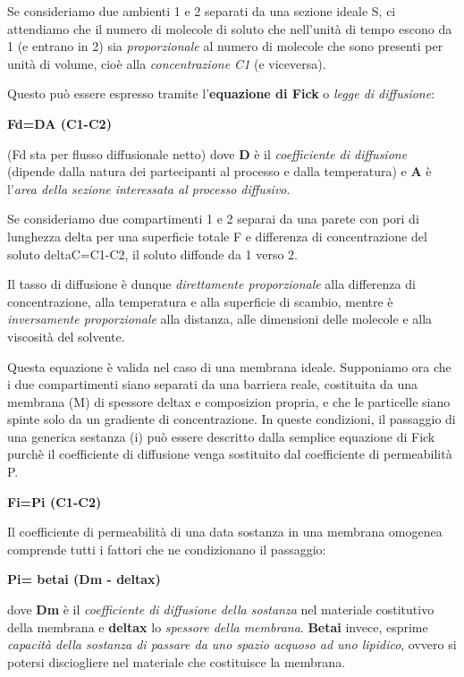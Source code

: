 \documentclass[]{article}
\begin{document}
Se consideriamo due ambienti 1 e 2 separati da una sezione ideale S, ci
attendiamo che il numero di molecole di soluto che nell'unità di tempo
escono da 1 (e entrano in 2) sia \emph{proporzionale} al numero di
molecole che sono presenti per unità di volume, cioè alla
\emph{concentrazione C1} (e viceversa).

Questo può essere espresso tramite l'\textbf{equazione di Fick} o
\emph{legge di diffusione}:

\textbf{Fd=DA (C1-C2)}

(Fd sta per flusso diffusionale netto) dove \textbf{D} è il
\emph{coefficiente di diffusione} (dipende dalla natura dei partecipanti
al processo e dalla temperatura) e \textbf{A} è l'\emph{area della
sezione interessata al processo diffusivo}.

Se consideriamo due compartimenti 1 e 2 separai da una parete con pori
di lunghezza delta per una superficie totale F e differenza di
concentrazione del soluto deltaC=C1-C2, il soluto diffonde da 1 verso 2.

Il tasso di diffusione è dunque \emph{direttamente proporzionale} alla
differenza di concentrazione, alla temperatura e alla superficie di
scambio, mentre è \emph{inversamente proporzionale} alla distanza, alle
dimensioni delle molecole e alla viscosità del solvente.

Questa equazione è valida nel caso di una membrana ideale. Supponiamo
ora che i due compartimenti siano separati da una barriera reale,
costituita da una membrana (M) di spessore deltax e composizion propria,
e che le particelle siano spinte solo da un gradiente di concentrazione.
In queste condizioni, il passaggio di una generica sestanza (i) può
essere descritto dalla semplice equazione di Fick purchè il coefficiente
di diffusione venga sostituito dal coefficiente di permeabilità P.

\textbf{Fi=Pi (C1-C2)}

Il coefficiente di permeabilità di una data sostanza in una membrana
omogenea comprende tutti i fattori che ne condizionano il passaggio:

\textbf{Pi= betai (Dm - deltax)}

dove \textbf{Dm} è il \emph{coefficiente di diffusione della sostanza}
nel materiale costitutivo della membrana e \textbf{deltax} lo
\emph{spessore della membrana}. \textbf{Betai} invece, esprime
\emph{capacità della sostanza di passare da uno spazio acquoso ad uno
lipidico}, ovvero si potersi disciogliere nel materiale che costituisce
la membrana.
\end{document}
